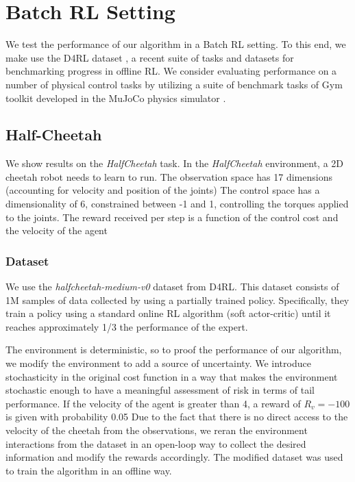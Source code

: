 
\section{Batch RL Setting}
We test the performance of our algorithm in a Batch RL setting.
To this end, we make use the D4RL dataset \cite{d4rl}, a recent suite of tasks and datasets for
benchmarking progress in offline RL.
We consider evaluating performance on a number of physical control tasks by utilizing
a suite of benchmark tasks of Gym toolkit developed in the MuJoCo
physics simulator \citep{Todorov2012}.

\subsection{Half-Cheetah}
We show results on the \textit{HalfCheetah} task.
In the \textit{HalfCheetah} environment, a 2D cheetah robot needs to learn to run.
The observation space has 17 dimensions (accounting for velocity and position of the joints)
The control space has a dimensionality of 6, constrained between -1 and 1, 
controlling the torques applied to the joints.
The reward received per step is a function of the control cost and the velocity of the agent

\subsubsection{Dataset}
We use the \textit{halfcheetah-medium-v0} dataset from D4RL. This dataset consists of 1M samples 
of data collected by using a partially trained policy. Specifically, they train a policy
using a standard online RL algorithm (soft actor-critic) until it reaches 
approximately 1/3 the performance of the expert.

The environment is deterministic, so to proof the performance of our algorithm, we modify the environment to
add a source of uncertainty. We introduce stochasticity in the original cost function in a way that 
makes the environment stochastic enough to have a meaningful assessment of risk in terms of 
tail performance.
If the velocity of the agent is greater than 4, a reward of $R_v=-100$ is given with probability 0.05 
Due to the fact that there is no direct access to the velocity of the cheetah from the observations,
we reran the environment interactions from the dataset in an open-loop way to collect the desired information and 
modify the rewards accordingly.
The modified dataset was used to train the algorithm in an offline way.

